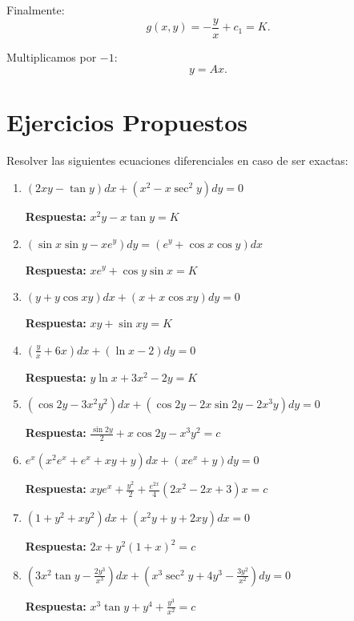 \noindent Finalmente:
\[
g( x,y) = -\frac{y}{x} + c_{1} = K.
\]

\noindent Multiplicamos por \( -1 \):
\[
y = Ax.
\]

\section{Ejercicios Propuestos}

Resolver las siguientes ecuaciones diferenciales en caso de ser exactas:

\begin{enumerate}
    \item \( (2xy - \tan y)dx + (x^2 - x\sec^2 y)dy = 0 \)
    
    \textbf{Respuesta:} \( x^2 y - x \tan y = K \)

    \item \( (\sin x \sin y - x e^y)dy = (e^y + \cos x \cos y)dx \)
    
    \textbf{Respuesta:} \( x e^y + \cos y \sin x = K \)

    \item \( (y + y \cos xy) dx + (x + x \cos xy) dy = 0 \)
    
    \textbf{Respuesta:} \( xy + \sin xy = K \)

    \item \( \left(\frac{y}{x} + 6x\right) dx + (\ln x -2) dy = 0 \)
    
    \textbf{Respuesta:} \( y \ln x + 3x^2 - 2y = K \)

    \item \( (\cos 2y - 3x^2 y^2)dx + (\cos 2y - 2x \sin 2y - 2x^3 y)dy = 0 \)
    
    \textbf{Respuesta:} \( \frac{\sin 2y}{2} + x \cos 2y - x^3 y^2 = c \)

    \item \( e^x (x^2 e^x + e^x + xy + y)dx + (x e^x + y)dy = 0 \)
    
    \textbf{Respuesta:} \( x y e^x + \frac{y^2}{2} + \frac{e^{2x}}{4} (2x^2 - 2x + 3)x = c \)

    \item \( (1 + y^2 + xy^2)dx + (x^2 y + y + 2xy)dx = 0 \)
    
    \textbf{Respuesta:} \( 2x + y^2 (1 + x)^2 = c \)

    \item \( (3x^2 \tan y - \frac{2y^3}{x^3})dx + (x^3 \sec^2 y + 4y^3 - \frac{3y^2}{x^2})dy = 0 \)
    
    \textbf{Respuesta:} \( x^3 \tan y + y^4 + \frac{y^3}{x^2} = c \)


\end{enumerate}
